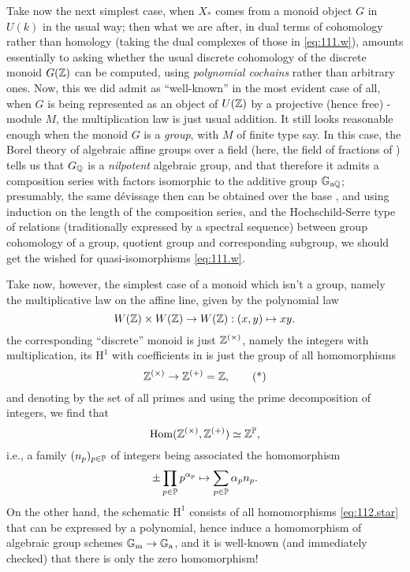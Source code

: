 Take now the next simplest case, when $X_*$ comes from a monoid object
$G$ in $U(k)$ in the usual way; then what we are after, in dual terms
of cohomology rather than homology (taking the dual complexes of those
in \eqref{eq:111.w}), amounts essentially to asking whether the usual
discrete cohomology of the discrete monoid $G({\mathbb{Z}})$ can be computed,
using \emph{polynomial cochains} rather than arbitrary ones. Now, this
we did admit as ``well-known'' in the most evident case of all, when
$G$ is being represented as an object of $U({\mathbb{Z}})$ by a projective
(hence free) \bZ-module $M$, the multiplication law is just usual
addition. It still looks reasonable enough when the monoid $G$ is a
\emph{group}, with $M$ of finite type say. In this case, the Borel
theory of algebraic affine groups over a field (here, the
field of fractions \bQ{} of \bZ) tells us that $G_{\mathbb{Q}}$ is a
\emph{nilpotent} algebraic group, and that therefore it admits a
composition series with factors isomorphic to the additive group
${\mathbb{G}}_{\mathrm a {\mathbb{Q}}}$; presumably, the same dévissage then can
be obtained over the base \bZ, and using induction on the length of
the composition series, and the Hochschild-Serre type of relations
(traditionally expressed by a spectral sequence) between group
cohomology of a group, quotient group and corresponding subgroup, we
should get the wished for quasi-isomorphisms \eqref{eq:111.w}.

Take now, however, the simplest case of a monoid which isn't a group,
namely the multiplicative law on the affine line, given by the
polynomial law
\[W({\mathbb{Z}}) \times W({\mathbb{Z}}) \to W({\mathbb{Z}}) : (x,y) \mapsto xy.\]
the corresponding ``discrete'' monoid is just ${\mathbb{Z}}^{(\times)}$, namely
the integers with multiplication, its $\mathrm H^1$ with coefficients
in \bZ{} is just the group of all homomorphisms
\begin{equation}
  \label{eq:112.star}
  {\ensuremath{\mathbb{Z}}}^{(\times)} \to {\ensuremath{\mathbb{Z}}}^{(+)} = {\mathbb{Z}},\tag{*}
\end{equation}
and denoting by \bP{} the set of all primes and using the prime
decomposition of integers, we find that
\[\operatorname{Hom}({\mathbb{Z}}^{(\times)}, {\mathbb{Z}}^{(+)}) \simeq {\ensuremath{\mathbb{Z}}}^{\mathbb{P}},\]
i.e., a family $(n_p)_{p\in{\ensuremath{\mathbb{P}}}}$ of integers being associated the
homomorphism
\[\pm\prod_{p\in{\ensuremath{\mathbb{P}}}} p^{\alpha_p} \mapsto \sum_{p\in{\ensuremath{\mathbb{P}}}}\alpha_p
n_p.\]
On the other hand, the schematic $\mathrm H^1$ consists of all
homomorphisms \eqref{eq:112.star} that can be expressed by a
polynomial, hence induce a homomorphism of algebraic group schemes
${\mathbb{G}}_{\mathrm{m}}\to{\ensuremath{\mathbb{G}}}_{\mathrm{a}}$, and it is well-known (and immediately checked)
that there is only the zero homomorphism!

